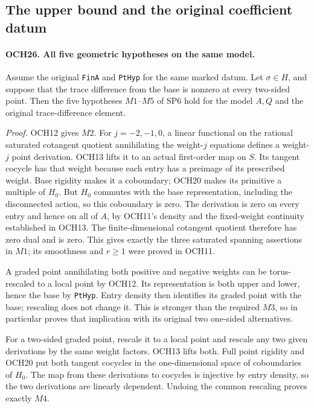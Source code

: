 \subsection{The upper bound and the original coefficient datum}

\paragraph{OCH26. All five geometric hypotheses on the same model.}
\label{claim:OCH26}
Assume the original \texttt{FinA} and \texttt{PtHyp} for the
same marked datum.  Let \(\sigma\in H\), and suppose that
the trace difference from the base is nonzero at every two-sided
point.  Then the five hypotheses \(M1\)--\(M5\) of SP6 hold
for the model \(A,Q\) and the original trace-difference element.

\emph{Proof.}
OCH12 gives \(M2\).  For \(j=-2,-1,0\), a linear
functional on the rational saturated cotangent quotient annihilating
the weight-\(j\) equations defines a weight-\(j\) point
derivation.  OCH13 lifts it to an actual first-order map on
\(S\).  Its tangent cocycle has that weight because each entry
has a preimage of its prescribed weight.  Base rigidity makes it
a coboundary; OCH20 makes its primitive a multiple of \(H_0\).
But \(H_0\) commutes with the base representation, including
the disconnected action, so this coboundary is zero.  The
derivation is zero on every entry and hence on all of \(A\),
by OCH11's density and the fixed-weight continuity established in
OCH13.  The finite-dimensional cotangent quotient therefore has
zero dual and is zero.  This gives exactly the three saturated
spanning assertions in \(M1\); its smoothness and \(r\ge1\)
were proved in OCH11.

A graded point annihilating both positive and negative weights can
be torus-rescaled to a local point by OCH12.  Its representation
is both upper and lower, hence the base by \texttt{PtHyp}.
Entry density then identifies its graded point with the base;
rescaling does not change it.  This is stronger than the required
\(M3\), so in particular proves that implication with its
original two one-sided alternatives.

For a two-sided graded point, rescale it to a local point and
rescale any two given derivations by the same weight factors.
OCH13 lifts both.  Full point rigidity and OCH20 put both tangent
cocycles in the one-dimensional space of coboundaries of \(H_0\).
The map from these derivations to cocycles is injective by entry
density, so the two derivations are linearly dependent.  Undoing
the common rescaling proves exactly \(M4\).

